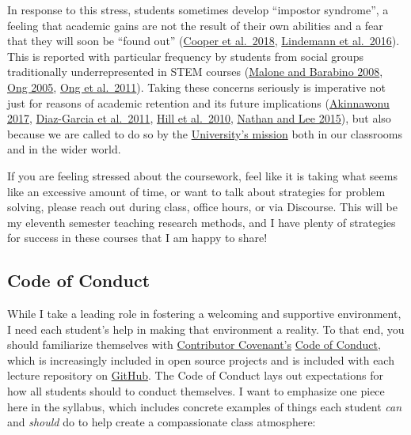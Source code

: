 \documentclass[]{book}
\begin{document}
In response to this stress, students sometimes develop ``impostor syndrome'', a feeling that academic gains are not the result of their own abilities and a fear that they will soon be ``found out'' (\href{https://www.physiology.org/doi/10.1152/advan.00085.2017}{Cooper et al.~2018}, \href{http://genderandset.open.ac.uk/index.php/genderandset/article/view/435}{Lindemann et al.~2016}). This is reported with particular frequency by students from social groups traditionally underrepresented in STEM courses (\href{https://onlinelibrary.wiley.com/doi/pdf/10.1002/sce.20307}{Malone and Barabino 2008}, \href{https://doi.org/10.1525/sp.2005.52.4.593}{Ong 2005}, \href{https://doi.org/10.17763/haer.81.2.t022245n7x4752v2}{Ong et al.~2011}). Taking these concerns seriously is imperative not just for reasons of academic retention and its future implications (\href{https://open.nytimes.com/why-having-a-diverse-team-will-make-your-products-better-c73e7518f677}{Akinnawonu 2017}, \href{https://www.tandfonline.com/doi/abs/10.5172/impp.2013.15.2.149}{Diaz-Garcia et al.~2011}, \href{https://www.aauw.org/aauw_check/pdf_download/show_pdf.php?file=why-so-few-research}{Hill et al.~2010}, \href{https://www.tandfonline.com/doi/abs/10.1111/ecge.12016}{Nathan and Lee 2015}), but also because we are called to do so by the \href{https://www.slu.edu/about/catholic-jesuit-identity/mission.php}{University's mission} both in our classrooms and in the wider world.

If you are feeling stressed about the coursework, feel like it is taking what seems like an excessive amount of time, or want to talk about strategies for problem solving, please reach out during class, office hours, or via Discourse. This will be my eleventh semester teaching research methods, and I have plenty of strategies for success in these courses that I am happy to share!

\hypertarget{code-of-conduct}{%
\subsection{Code of Conduct}\label{code-of-conduct}}

While I take a leading role in fostering a welcoming and supportive environment, I need each student's help in making that environment a reality. To that end, you should familiarize themselves with \href{https://www.contributor-covenant.org}{Contributor Covenant's} \href{https://www.contributor-covenant.org/version/1/4/code-of-conduct}{Code of Conduct}, which is increasingly included in open source projects and is included with each lecture repository on \href{https://github.com/slu-soc5650}{GitHub}. The Code of Conduct lays out expectations for how all students should to conduct themselves. I want to emphasize one piece here in the syllabus, which includes concrete examples of things each student \emph{can} and \emph{should} do to help create a compassionate class atmosphere:
\end{document}
